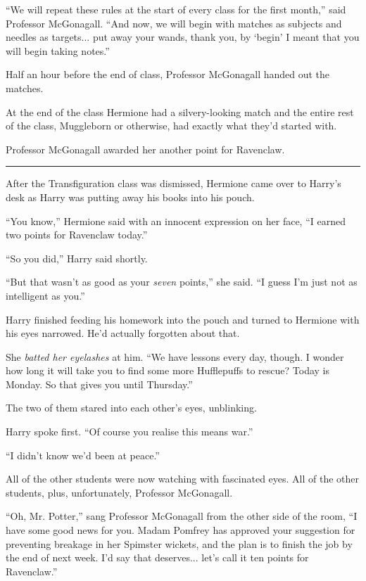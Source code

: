 ``We will repeat these rules at the start of every class for the first month,'' said Professor McGonagall. ``And now, we will begin with matches as subjects and needles as targets... put away your wands, thank you, by `begin' I meant that you will begin taking notes.''

Half an hour before the end of class, Professor McGonagall handed out the matches.

At the end of the class Hermione had a silvery-looking match and the entire rest of the class, Muggleborn or otherwise, had exactly what they'd started with.

Professor McGonagall awarded her another point for Ravenclaw.

\begin{center}\rule{3in}{0.4pt}\end{center}

After the Transfiguration class was dismissed, Hermione came over to Harry's desk as Harry was putting away his books into his pouch.

``You know,'' Hermione said with an innocent expression on her face, ``I earned two points for Ravenclaw today.''

``So you did,'' Harry said shortly.

``But that wasn't as good as your \emph{seven} points,'' she said. ``I guess I'm just not as intelligent as you.''

Harry finished feeding his homework into the pouch and turned to Hermione with his eyes narrowed. He'd actually forgotten about that.

She \emph{batted her eyelashes} at him. ``We have lessons every day, though. I wonder how long it will take you to find some more Hufflepuffs to rescue? Today is Monday. So that gives you until Thursday.''

The two of them stared into each other's eyes, unblinking.

Harry spoke first. ``Of course you realise this means war.''

``I didn't know we'd been at peace.''

All of the other students were now watching with fascinated eyes. All of the other students, plus, unfortunately, Professor McGonagall.

``Oh, Mr. Potter,'' sang Professor McGonagall from the other side of the room, ``I have some good news for you. Madam Pomfrey has approved your suggestion for preventing breakage in her Spimster wickets, and the plan is to finish the job by the end of next week. I'd say that deserves... let's call it ten points for Ravenclaw.''

